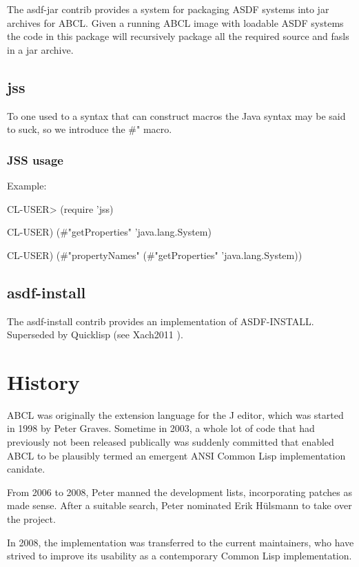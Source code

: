 \documentclass[10pt]{book}
\begin{document}
The asdf-jar contrib provides a system for packaging ASDF systems into
jar archives for ABCL.  Given a running ABCL image with loadable ASDF
systems the code in this package will recursively package all the
required source and fasls in a jar archive.

\section{jss}
\label{section:jss}

To one used to a syntax that can construct macros the Java syntax
may be said to suck, so we introduce the \#" macro.

\subsection{JSS usage}

Example:

\begin{listing-lisp}
CL-USER> (require 'jss)

CL-USER) (#"getProperties" 'java.lang.System)

CL-USER) (#"propertyNames" (#"getProperties" 'java.lang.System))
\end{listing-lisp}

\section{asdf-install}

The asdf-install contrib provides an implementation of ASDF-INSTALL.
Superseded by Quicklisp (see Xach2011 \cite{Xach2011}).

\chapter{History}

\textsc{ABCL} was originally the extension language for the J editor, which was
started in 1998 by Peter Graves.  Sometime in 2003, a whole lot of
code that had previously not been released publically was suddenly
committed that enabled ABCL to be plausibly termed an emergent ANSI
Common Lisp implementation canidate.

From 2006 to 2008, Peter manned the development lists, incorporating
patches as made sense.  After a suitable search, Peter nominated Erik
H\"{u}lsmann to take over the project.

In 2008, the implementation was transferred to the current
maintainers, who have strived to improve its usability as a
contemporary Common Lisp implementation.
\end{document}
